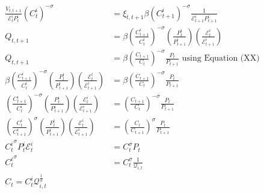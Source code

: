 \documentclass[12pt]{article}
\begin{document}
\begin{align}
    \frac{V_{t,t+1}}{\mathcal{E}^i_tP^i_t}({C^{i}_{t}})^{-\sigma}                                                                                           & = \xi_{t,t+1} \beta ({C^{i}_{t+1}})^{-\sigma} \frac{1}{\mathcal{E}^i_{t+1}P^{i}_{t+1}}                                                                    \\
    Q_{t,t+1}                                                                                                                                               & = \beta \left(\frac{C^i_{t+1}}{C^i_{t}}\right)^{-\sigma} \left(\frac{P^i_t}{P^i_{t+1}}\right) \left(\frac{\mathcal{E}^i_{t}}{\mathcal{E}^i_{t+1}} \right) \\
    Q_{t,t+1}                                                                                                                                               & = \beta \left(\frac{C_{t+1}}{C_{t}}\right)^{-\sigma} \frac{P_t}{P_{t+1}}  \text{ using Equation (XX)}                                                     \\
    \beta \left(\frac{C^i_{t+1}}{C^i_{t}}\right)^{-\sigma} \left(\frac{P^i_t}{P^i_{t+1}}\right) \left(\frac{\mathcal{E}^i_{t}}{\mathcal{E}^i_{t+1}} \right) & = \beta \left(\frac{C_{t+1}}{C_{t}}\right)^{-\sigma} \frac{P_t}{P_{t+1}}                                                                                  \\
    \left(\frac{C^i_{t+1}}{C^i_{t}}\right)^{-\sigma} \left(\frac{P^i_t}{P^i_{t+1}}\right) \left(\frac{\mathcal{E}^i_{t}}{\mathcal{E}^i_{t+1}} \right)       & = \left(\frac{C_{t+1}}{C_{t}}\right)^{-\sigma} \frac{P_t}{P_{t+1}}                                                                                        \\
    \left(\frac{C^i_{t}}{C^i_{t+1}}\right)^{\sigma} \left(\frac{P^i_t}{P^i_{t+1}}\right) \left(\frac{\mathcal{E}^i_{t}}{\mathcal{E}^i_{t+1}} \right)        & = \left(\frac{C_{t}}{C_{t+1}}\right)^{\sigma} \frac{P_t}{P_{t+1}}                                                                                         \\
    {C^{i}_{t}}^{\sigma} P_t^i \mathcal{E}_t^i                                                                                                              & = C_t^{\sigma} P_t                                                                                                                                        \\
    {C^{i}_{t}}^{\sigma}                                                                                                                                    & = C_t^{\sigma} \frac{1}{\mathcal{Q}_{i,t}}                                                                                                                \\
    C_t = C^i_t \mathcal{Q}_{i,t}^{\frac{1}{\sigma}} \label{eq:domestic_consumption_and_real_exchange_rate}
\end{align}
\end{document}
